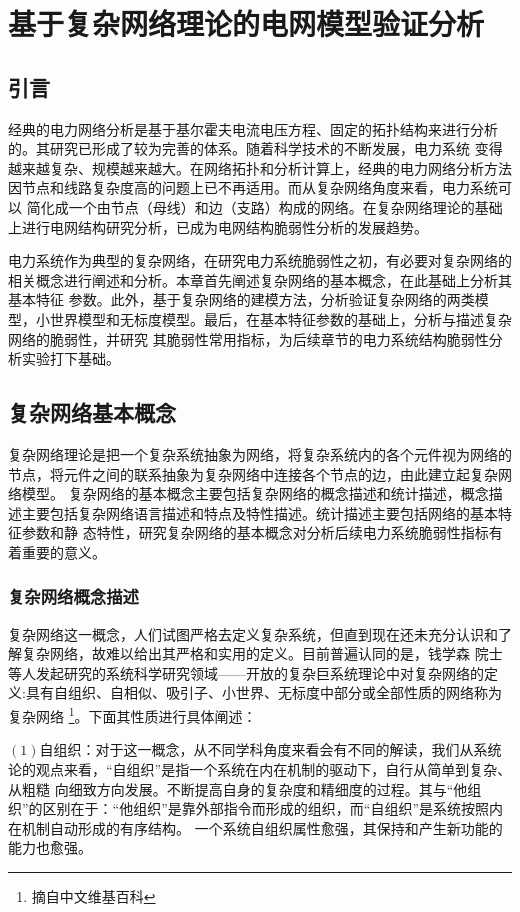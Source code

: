 \chapter{基于复杂网络理论的电网模型验证分析}
\label{cha:model}

\section{引言}
\label{sec:index2}
经典的电力网络分析是基于基尔霍夫电流电压方程、固定的拓扑结构来进行分析的。其研究已形成了较为完善的体系\cite{refs60}。随着科学技术的不断发展，电力系统
变得越来越复杂、规模越来越大。在网络拓扑和分析计算上，经典的电力网络分析方法因节点和线路复杂度高的问题上已不再适用。而从复杂网络角度来看，电力系统可以
简化成一个由节点（母线）和边（支路）构成的网络。在复杂网络理论的基础上进行电网结构研究分析，已成为电网结构脆弱性分析的发展趋势。

电力系统作为典型的复杂网络，在研究电力系统脆弱性之初，有必要对复杂网络的相关概念进行阐述和分析。本章首先阐述复杂网络的基本概念，在此基础上分析其基本特征
参数。此外，基于复杂网络的建模方法，分析验证复杂网络的两类模型，小世界模型和无标度模型。最后，在基本特征参数的基础上，分析与描述复杂网络的脆弱性，并研究
其脆弱性常用指标，为后续章节的电力系统结构脆弱性分析实验打下基础。

\section{复杂网络基本概念}
\label{sec:powersys}
复杂网络理论是把一个复杂系统抽象为网络，将复杂系统内的各个元件视为网络的节点，将元件之间的联系抽象为复杂网络中连接各个节点的边，由此建立起复杂网络模型。
复杂网络的基本概念主要包括复杂网络的概念描述和统计描述，概念描述主要包括复杂网络语言描述和特点及特性描述。统计描述主要包括网络的基本特征参数和静
态特性，研究复杂网络的基本概念对分析后续电力系统脆弱性指标有着重要的意义。

\subsection{复杂网络概念描述}
\label{sec:composite}
复杂网络这一概念，人们试图严格去定义复杂系统，但直到现在还未充分认识和了解复杂网络，故难以给出其严格和实用的定义\cite{refs31}。目前普遍认同的是，钱学森
院士等人发起研究的系统科学研究领域——开放的复杂巨系统理论中对复杂网络的定义:具有自组织、自相似、吸引子、小世界、无标度中部分或全部性质的网络称为复杂网络
\footnote{摘自中文维基百科}。下面其性质进行具体阐述：

$(1)$自组织：对于这一概念，从不同学科角度来看会有不同的解读，我们从系统论的观点来看，“自组织”是指一个系统在内在机制的驱动下，自行从简单到复杂、从粗糙
向细致方向发展。不断提高自身的复杂度和精细度的过程。其与“他组织”的区别在于：“他组织”是靠外部指令而形成的组织，而“自组织”是系统按照内在机制自动形成的有序结构。
一个系统自组织属性愈强，其保持和产生新功能的能力也愈强。

